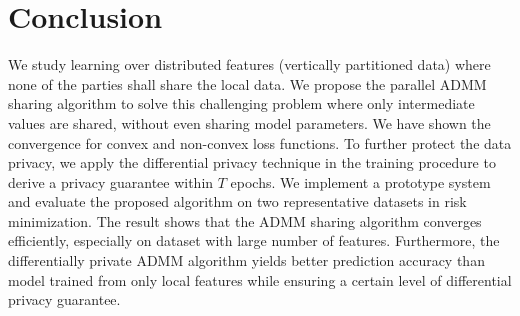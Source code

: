 \section{Conclusion}

We study learning over distributed features (vertically partitioned data) where none of the parties shall share the local data. %
We propose the parallel ADMM sharing algorithm to solve this challenging problem where only intermediate values are shared, without even sharing model parameters. We have shown the convergence for convex and non-convex loss functions. To further protect the data privacy, we apply the differential privacy technique in the training procedure to derive a privacy guarantee within $T$ epochs. 
We implement a prototype system and evaluate the proposed algorithm on two representative datasets in risk minimization. The result shows that the ADMM sharing algorithm converges efficiently, especially on dataset with large number of features. Furthermore, the differentially private ADMM algorithm yields better prediction accuracy than model trained from only local features while ensuring a certain level of differential privacy guarantee. 